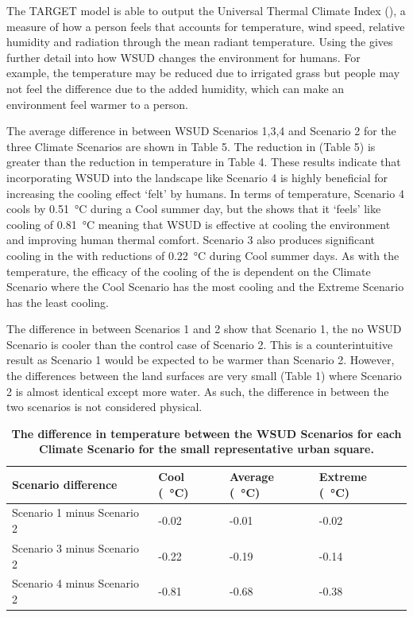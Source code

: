 \documentclass[final,3p,times,authoryear]{elsarticle}
\begin{document}
The TARGET model is able to output the Universal Thermal Climate Index (), a measure of how a person feels that accounts for temperature, wind speed, relative humidity and radiation through the mean radiant temperature. Using the  gives further detail into how WSUD changes the environment for humans. For example, the temperature may be reduced due to irrigated grass but people may not feel the difference due to the added humidity, which can make an environment feel warmer to a person.

The average difference in  between WSUD Scenarios 1,3,4 and Scenario 2 for the three Climate Scenarios are shown in Table 5. The reduction in  (Table 5) is greater than the reduction in temperature in Table 4. These results indicate that incorporating WSUD into the landscape like Scenario 4 is highly beneficial for increasing the cooling effect ‘felt’ by humans. In terms of temperature, Scenario 4 cools by 0.51\SI{}{\degreeCelsius} during a Cool summer day, but the  shows that it ‘feels’ like cooling of 0.81\SI{}{\degreeCelsius} meaning that WSUD is effective at cooling the environment and improving human thermal comfort. Scenario 3 also produces significant cooling in the  with reductions of 0.22\SI{}{\degreeCelsius} during Cool summer days. As with the temperature, the efficacy of the cooling of the  is dependent on the Climate Scenario where the Cool Scenario has the most cooling and the Extreme Scenario has the least cooling. 

The difference in  between Scenarios 1 and 2 show that Scenario 1, the no WSUD Scenario is cooler than the control case of Scenario 2. This is a counterintuitive result as Scenario 1 would be expected to be warmer than Scenario 2. However, the differences between the land surfaces are very small (Table 1) where Scenario 2 is almost identical except more water. As such, the difference in  between the two scenarios is not considered physical. 


\begin{table}[!htbp]
\caption{\bf The difference in temperature between the WSUD Scenarios for each Climate Scenario for the small representative urban square. \label{tab:scenarioDiffRep2}}     
\begin{tabular}{ l l l l}
\textbf{Scenario difference} & \textbf{Cool (\SI{}{\degreeCelsius})}
& \textbf{Average (\SI{}{\degreeCelsius})}
& \textbf{Extreme (\SI{}{\degreeCelsius})}\\ \hline
Scenario 1 minus Scenario 2 & -0.02  & -0.01 & -0.02\\ 
Scenario 3 minus Scenario 2 & -0.22  & -0.19 & -0.14\\ 
Scenario 4 minus Scenario 2 & -0.81  & -0.68 & -0.38\\ 
\hline
\end{tabular}
\end{table}
\end{document}
